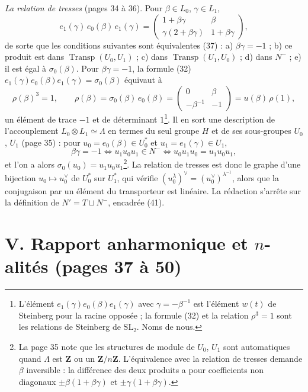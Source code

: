 \documentclass[11pt,a4paper]{article}
\begin{document}
\emph{La relation de tresses} (pages 34 à 36). Pour $\beta \in L_0$, $\gamma \in
L_1$,
\[
  e_1(\gamma)\,e_0(\beta)\,e_1(\gamma) = \begin{pmatrix} 1 + \beta\gamma & \beta
  \\ \gamma(2 + \beta\gamma) & 1 + \beta\gamma\end{pmatrix},
\]
de sorte que les conditions suivantes sont équivalentes (37) : a)
$\beta\gamma = -1$ ; b) ce produit est dans $\operatorname{Transp}(U_0, U_1)$ ;
c) dans $\operatorname{Transp}(U_1, U_0)$ ; d) dans $N^{-}$ ; e) il est égal à
$\sigma_0(\beta)$. Pour $\beta\gamma = -1$, la formule (32)
$e_1(\gamma)e_0(\beta)e_1(\gamma) = \sigma_0(\beta)$ équivaut à
\[
  \rho(\beta)^3 = 1,\qquad \rho(\beta) = \sigma_0(\beta)\,e_0(\beta) =
  \begin{pmatrix} 0 & \beta \\ -\beta^{-1} & -1\end{pmatrix} = u(\beta)\,\rho(1),
\]
un élément de trace $-1$ et de déterminant $1$\footnote{L'élément
$e_1(\gamma)e_0(\beta)e_1(\gamma)$ avec $\gamma = -\beta^{-1}$ est l'élément
$w(t)$ de Steinberg pour la racine opposée ; la formule (32) et la relation
$\rho^3 = 1$ sont les relations de Steinberg de $\mathrm{SL}_2$. Noms de
nous.}. Il en sort une description de l'accouplement $L_0 \otimes L_1 \simeq
\Lambda$ en termes du seul groupe $H$ et de ses sous-groupes $U_0$, $U_1$
(page 35) : pour $u_0 = e_0(\beta) \in U_0^{*}$ et $u_1 = e_1(\gamma) \in U_1$,
\[
  \beta\gamma = -1 \iff u_1u_0u_1 \in N^{-} \iff u_0u_1u_0 = u_1u_0u_1 ,
\]
et l'on a alors $\sigma_0(u_0) = u_1u_0u_1$\footnote{La page 35 note que les
structures de module de $U_0$, $U_1$ sont automatiques quand $\Lambda$ est
$\mathbf{Z}$ ou un $\mathbf{Z}/n\mathbf{Z}$. L'équivalence avec la relation de
tresses demande $\beta$ inversible : la différence des deux produits a pour
coefficients non diagonaux $\pm\beta(1+\beta\gamma)$ et $\pm\gamma(1 +
\beta\gamma)$.}. La relation de tresses est donc le graphe d'une bijection
$u_0 \mapsto u_0^{\vee}$ de $U_0^{*}$ sur $U_1^{*}$, qui vérifie
$(u_0^{\lambda})^{\vee} = (u_0^{\vee})^{\lambda^{-1}}$, alors que la
conjugaison par un élément du transporteur est linéaire. La rédaction
s'arrête sur la définition de $N' = T \sqcup N^{-}$, encadrée (41).

\section*{V. Rapport anharmonique et $n$-alités (pages 37 à 50)}
\end{document}

